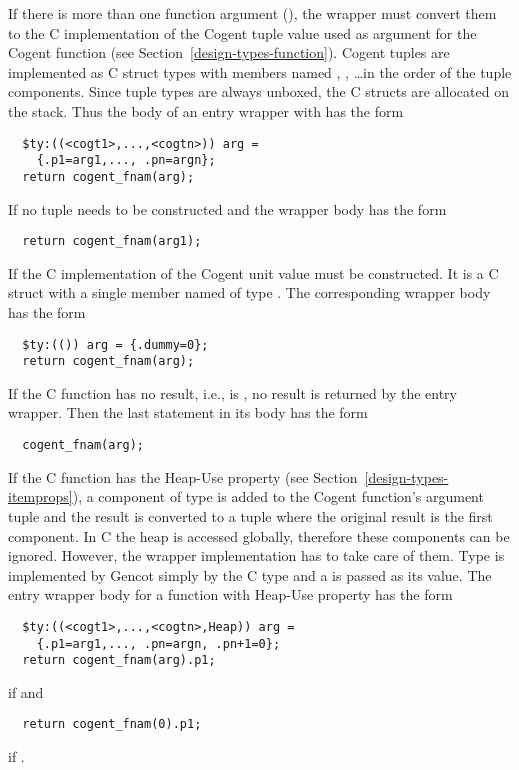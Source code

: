 If there is more than one function argument (), the wrapper must convert them to the C implementation
of the Cogent tuple value used as argument for the Cogent function (see Section~\ref{design-types-function}).
Cogent tuples are implemented as C struct types with members named , , \ldots in the order
of the tuple components. Since tuple types are always unboxed, the C structs are allocated on the stack. Thus
the body of an entry wrapper with  has the form
\begin{verbatim}
  $ty:((<cogt1>,...,<cogtn>)) arg = 
    {.p1=arg1,..., .pn=argn};
  return cogent_fnam(arg);
\end{verbatim}

If  no tuple needs to be constructed and the wrapper body has the form
\begin{verbatim}
  return cogent_fnam(arg1);
\end{verbatim}

If  the C implementation of the Cogent unit value must be constructed. It is a C struct with 
a single member named  of type . The corresponding wrapper body has the form
\begin{verbatim}
  $ty:(()) arg = {.dummy=0};
  return cogent_fnam(arg);
\end{verbatim}

If the C function has no result, i.e.,  is , no result is returned by the entry
wrapper. Then the last statement in its body has the form
\begin{verbatim}
  cogent_fnam(arg);
\end{verbatim}

If the C function has the Heap-Use property (see Section~\ref{design-types-itemprops}), a component of type
 is added to the Cogent function's argument tuple and the result is converted to a tuple where the
original result is the first component. In C the heap is accessed globally, therefore these components can 
be ignored. However, the wrapper implementation has to take care of them. Type  is implemented by
Gencot simply by the C type  and a  is passed as its value. The entry wrapper body for a
function with Heap-Use property has the form
\begin{verbatim}
  $ty:((<cogt1>,...,<cogtn>,Heap)) arg = 
    {.p1=arg1,..., .pn=argn, .pn+1=0};
  return cogent_fnam(arg).p1;
\end{verbatim}
if  and
\begin{verbatim}
  return cogent_fnam(0).p1;
\end{verbatim}
if .

